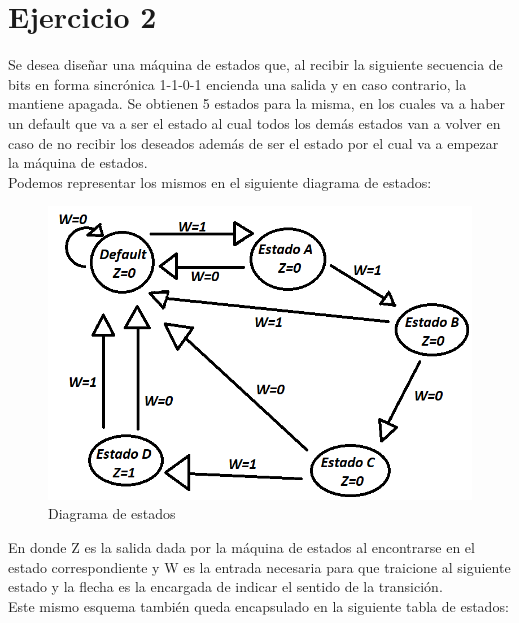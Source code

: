 \chapter{Ejercicio 2}
Se desea diseñar una máquina de estados que, al recibir la siguiente secuencia de bits en forma sincrónica 1-1-0-1 encienda una salida y en caso contrario, la mantiene apagada. Se obtienen 5 estados para la misma, en los cuales va a haber un default que va a ser el estado al cual todos los demás estados van a volver en caso de no recibir los deseados además de ser el estado por el cual va a empezar la máquina de estados.\\
Podemos representar los mismos en el siguiente diagrama de estados:\\
\begin{figure}[h!]
	\label{f:Moore}
	\centering
	\includegraphics[scale=0.4]{../Ejercicio-2/Diagrama_de_estados.png}
	\caption{Diagrama de estados}
\end{figure}
En donde Z es la salida dada por la máquina de estados al encontrarse en el estado correspondiente y W es la entrada necesaria para que traicione al siguiente estado y la flecha es la encargada de indicar el sentido de la transición.\\
Este mismo esquema también queda encapsulado en la siguiente tabla de estados:\\
\FloatBarrier
